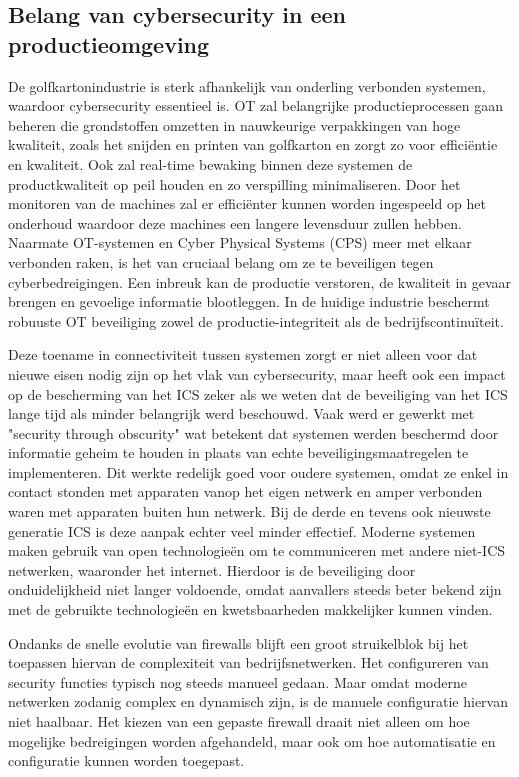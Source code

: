   
\subsection{Belang van cybersecurity in een productieomgeving}

De golfkartonindustrie is sterk afhankelijk van onderling verbonden systemen, waardoor cybersecurity essentieel is. OT zal belangrijke productieprocessen gaan beheren die grondstoffen omzetten in nauwkeurige verpakkingen van hoge kwaliteit, zoals het snijden en printen van golfkarton en zorgt zo voor efficiëntie en kwaliteit. Ook zal real-time bewaking binnen deze systemen de productkwaliteit op peil houden en zo verspilling minimaliseren. Door het monitoren van de machines zal er efficiënter kunnen worden ingespeeld op het onderhoud waardoor deze machines een langere levensduur zullen hebben. Naarmate OT-systemen en Cyber Physical Systems (CPS) meer met elkaar verbonden raken, is het van cruciaal belang om ze te beveiligen tegen cyberbedreigingen. Een inbreuk kan de productie verstoren, de kwaliteit in gevaar brengen en gevoelige informatie blootleggen. In de huidige industrie beschermt robuuste OT beveiliging zowel de productie-integriteit als de bedrijfscontinuïteit. \autocite{fefco2025}

\vspace{5mm}
Deze toename in connectiviteit tussen systemen zorgt er niet alleen voor dat nieuwe eisen nodig zijn op het vlak van cybersecurity, maar heeft ook een impact op de bescherming van het ICS zeker als we weten dat de beveiliging van het ICS lange tijd als minder belangrijk werd beschouwd. Vaak werd er gewerkt met "security through obscurity" wat betekent dat systemen werden beschermd door informatie geheim te houden in plaats van echte beveiligingsmaatregelen te implementeren. Dit werkte redelijk goed voor oudere systemen, omdat ze enkel in contact stonden met apparaten vanop het eigen netwerk en amper verbonden waren met apparaten buiten hun netwerk. Bij de derde en tevens ook nieuwste generatie ICS is deze aanpak echter veel minder effectief. Moderne systemen maken gebruik van open technologieën om te communiceren met andere niet-ICS netwerken, waaronder het internet. Hierdoor is de beveiliging door onduidelijkheid niet langer voldoende, omdat aanvallers steeds beter bekend zijn met de gebruikte technologieën en kwetsbaarheden makkelijker kunnen vinden. \autocite{knowles2015}

\vspace{5mm}

Ondanks de snelle evolutie van firewalls blijft een groot struikelblok bij het toepassen hiervan de complexiteit van bedrijfsnetwerken. Het configureren van security functies typisch nog steeds manueel gedaan. Maar omdat moderne netwerken zodanig complex en dynamisch zijn, is de manuele configuratie hiervan niet haalbaar. Het kiezen van een gepaste firewall draait niet alleen om hoe mogelijke bedreigingen worden afgehandeld, maar ook om hoe automatisatie en configuratie kunnen worden toegepast.


